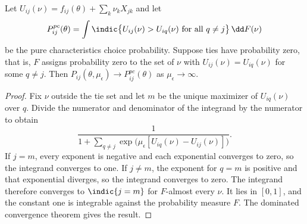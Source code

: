 \begin{proposition}\label{prop:06-limit}
Let $U_{ij}(\nu) = f_{ij}(\theta) + \sum_k \nu_k X_{jk}$ and let
\begin{equation*}
  P^{pc}_{ij}(\theta) = \int \indic\bigl\{U_{ij}(\nu) > U_{iq}(\nu) \text{ for all } q \ne j\bigr\}\,\dd F(\nu)
\end{equation*}
be the pure characteristics choice probability. Suppose ties have probability zero, that is, $F$ assigns probability
zero to the set of $\nu$ with $U_{ij}(\nu) = U_{iq}(\nu)$ for some $q \ne j$. Then $P_{ij}(\theta, \mu_\epsilon) \to
P^{pc}_{ij}(\theta)$ as $\mu_\epsilon \to \infty$.
\end{proposition}

\begin{proof}
Fix $\nu$ outside the tie set and let $m$ be the unique maximizer of $U_{iq}(\nu)$ over $q$. Divide the numerator and
denominator of the integrand by the numerator to obtain
\begin{equation*}
  \frac{1}{1 + \sum_{q \ne j} \exp\bigl(\mu_\epsilon [U_{iq}(\nu) - U_{ij}(\nu)]\bigr)} .
\end{equation*}
If $j = m$, every exponent is negative and each exponential converges to zero, so the integrand converges to one. If
$j \ne m$, the exponent for $q = m$ is positive and that exponential diverges, so the integrand converges to zero. The
integrand therefore converges to $\indic\{j = m\}$ for $F$-almost every $\nu$. It lies in $[0,1]$, and the constant one
is integrable against the probability measure $F$. The dominated convergence theorem gives the result.
\end{proof}

